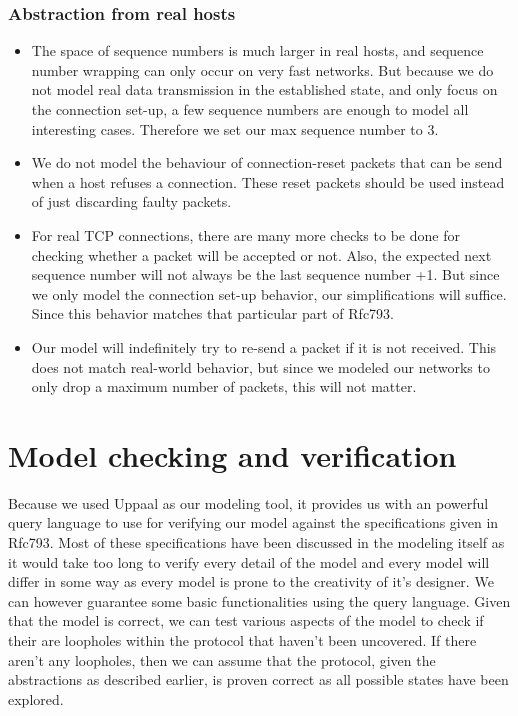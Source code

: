 \documentclass[twocolumn]{article}
\begin{document}
\subsubsection{Abstraction from real hosts}
\begin{itemize}
\item The space of sequence numbers is much larger in real hosts, and sequence number wrapping can only occur on very fast networks. But because we do not model real data transmission in the established state, and only focus on the connection set-up, a few sequence numbers are enough to model all interesting cases. Therefore we set our max sequence number to 3.
\item We do not model the behaviour of connection-reset packets that can be send when a host refuses a connection. These reset packets should be used instead of just discarding faulty packets.
\item For real TCP connections, there are many more checks to be done for checking whether a packet will be accepted or not. Also, the expected next sequence number will not always be the last sequence number +1. But since we only model the connection set-up behavior, our simplifications will suffice. Since this behavior matches that particular part of Rfc793.
\item Our model will indefinitely try to re-send a packet if it is not received. This does not match real-world behavior, but since we modeled our networks to only drop a maximum number of packets, this will not matter.
\end{itemize}






\section{Model checking and verification} %
\label{sec:model_checking_and_verification}
	Because we used Uppaal as our modeling tool, it provides us with an powerful query language to use for verifying our model against the specifications given in Rfc793. Most of these specifications have been discussed in the modeling itself as it would take too long to verify every detail of the model and every model will differ in some way as every model is prone to the creativity of it's designer. We can however guarantee some basic functionalities using the query language. Given that the model is correct, we can test various aspects of the model to check if their are loopholes within the protocol that haven't been uncovered. If there aren't any loopholes, then we can assume that the protocol, given the abstractions as described earlier, is proven correct as all possible states have been explored.
\end{document}
